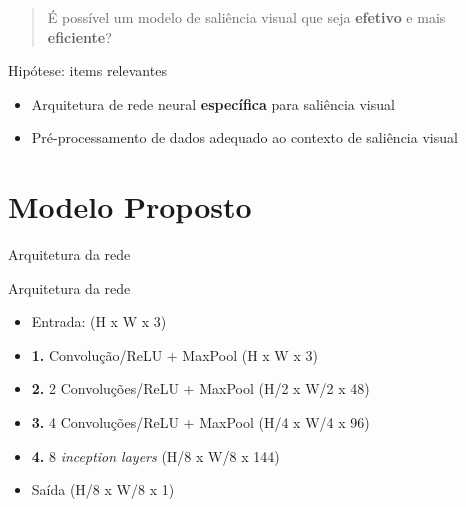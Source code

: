 \documentclass[10pt]{beamer}
\newcommand{\tit}[1]{\textit{#1}}
\newcommand{\tbf}[1]{\textbf{#1}}
\begin{document}

\begin{frame}{}
    \begin{quote}
        É possível um modelo de saliência visual que seja \tbf{efetivo} e
        mais \tbf{eficiente}?
    \end{quote}
\end{frame}

\begin{frame}{Hipótese: items relevantes}
    \begin{itemize}[<+->]
        \item Arquitetura de rede neural \tbf{específica} para saliência visual
        \item Pré-processamento de dados adequado ao contexto de saliência
            visual
    \end{itemize}
\end{frame}

\section{Modelo Proposto}

\begin{frame}{Arquitetura da rede}
    \begin{figure}[hbt]
        \centering
        \def\svgwidth{1.0\columnwidth}
        
        \label{fig:model}
    \end{figure}
\end{frame}

\begin{frame}{Arquitetura da rede}
    \begin{figure}[hbt]
        \centering
        \def\svgwidth{1.0\columnwidth}
        
        \label{fig:model}
    \end{figure}
    \begin{itemize}[<+->]
        \item Entrada: (H x W x 3)
        \item \tbf{1.} Convolução/ReLU + MaxPool (H x W x 3)
        \item \tbf{2.} 2 Convoluções/ReLU + MaxPool (H/2 x W/2 x 48)
        \item \tbf{3.} 4 Convoluções/ReLU + MaxPool (H/4 x W/4 x 96)
        \item \tbf{4.} 8 \tit{inception layers} (H/8 x W/8 x 144)
        \item Saída (H/8 x W/8 x 1)
    \end{itemize}
\end{frame}
\end{document}
